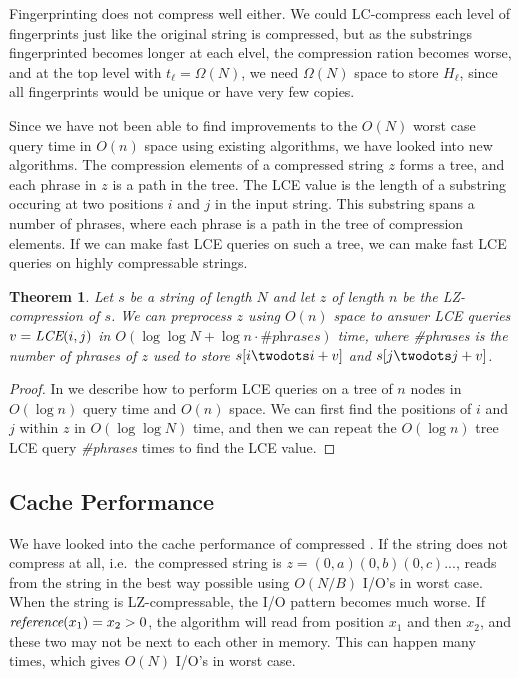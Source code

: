 \documentclass[a4]{article}
\newcommand*{\pref}{\prettyref}
\newtheorem{theorem}{Theorem}
\begin{document}
Fingerprinting does not compress well either. We could LC-compress each level of fingerprints just like the original string is compressed, but as the substrings fingerprinted becomes longer at each elvel, the compression ration becomes worse, and at the top level with $t_\ell = \Omega(N)$, we need $\Omega(N)$ space to store $H_\ell$, since all fingerprints would be unique or have very few copies.

Since we have not been able to find improvements to the $O(N)$ worst case query time in $O(n)$ space using existing algorithms, we have looked into new algorithms. The compression elements of a compressed string $z$ forms a tree, and each phrase in $z$ is a path in the tree. The LCE value is the length of a substring occuring at two positions $i$ and $j$ in the input string. This substring spans a number of phrases, where each phrase is a path in the tree of compression elements. If we can make fast LCE queries on such a tree, we can make fast LCE queries on highly compressable strings.

\begin{theorem}
Let $s$ be a string of length $N$ and let $z$ of length $n$ be the LZ-compression of $s$. We can preprocess $z$ using $O(n)$ space to answer LCE queries $v=\textit{LCE}(i,j)$ in $O(\log\log N + \log n \cdot \textit{\#phrases})$ time, where \textit{\#phrases} is the number of phrases of $z$ used to store $s[i\twodots i+v]$ and $s[j\twodots j+v]$.
\end{theorem}

\begin{proof}
In \pref{sec:tree-lce} we describe how to perform LCE queries on a tree of $n$ nodes in $O(\log n)$ query time and $O(n)$ space. We can first find the positions of $i$ and $j$ within $z$ in $O(\log\log N)$ time, and then we can repeat the $O(\log n)$ tree LCE query \textit{\#phrases} times to find the LCE value.
\end{proof}

\subsection{Cache Performance}

We have looked into the cache performance of compressed . If the string does not compress at all, i.e.\ the compressed string is $z=(0,a)(0,b)(0,c)...$,  reads from the string in the best way possible using $O(N/B)$ I/O's in worst case. When the string is LZ-compressable, the I/O pattern becomes much worse. If $\textit{reference}(x_1) = x_2 > 0$, the algorithm will read from position $x_1$ and then $x_2$, and these two may not be next to each other in memory. This can happen many times, which gives $O(N)$ I/O's in worst case.
\end{document}
